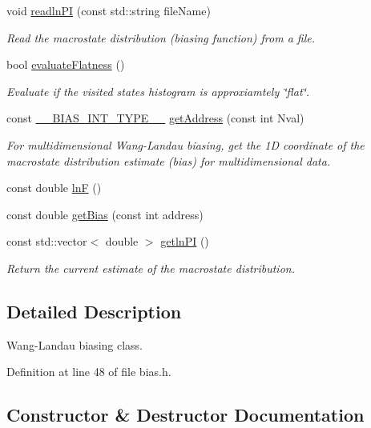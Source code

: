 \begin{DoxyCompactItemize}
void \hyperlink{classwala_ae04916f49c11b0636e813787a3906570}{readln\+P\+I} (const std\+::string file\+Name)
\begin{DoxyCompactList}\small\item\em Read the macrostate distribution (biasing function) from a file. \end{DoxyCompactList}\item 
bool \hyperlink{classwala_add6302db96fcc45811b2944de2936525}{evaluate\+Flatness} ()
\begin{DoxyCompactList}\small\item\em Evaluate if the visited states histogram is approxiamtely \char`\"{}flat\char`\"{}. \end{DoxyCompactList}\item 
const \hyperlink{bias_8h_a1ceb524363fcb94da0c64d297ea27438}{\+\_\+\+\_\+\+B\+I\+A\+S\+\_\+\+I\+N\+T\+\_\+\+T\+Y\+P\+E\+\_\+\+\_\+} \hyperlink{classwala_a01a9bf2af8eaf65c719745ad1b12d238}{get\+Address} (const int Nval)
\begin{DoxyCompactList}\small\item\em For multidimensional Wang-\/\+Landau biasing, get the 1\+D coordinate of the macrostate distribution estimate (bias) for multidimensional data. \end{DoxyCompactList}\item 
const double \hyperlink{classwala_acb8e59580d97bc3c5b9b4ff45eb6bb9a}{ln\+F} ()
\item 
const double \hyperlink{classwala_a03f7b333aa0a280e78060bd9af7ec318}{get\+Bias} (const int address)
\item 
const std\+::vector$<$ double $>$ \hyperlink{classwala_a80b00e34135eb6da4e81cd0935622fc5}{getln\+P\+I} ()
\begin{DoxyCompactList}\small\item\em Return the current estimate of the macrostate distribution. \end{DoxyCompactList}\end{DoxyCompactItemize}


\subsection{Detailed Description}
Wang-\/\+Landau biasing class. 

Definition at line 48 of file bias.\+h.



\subsection{Constructor \& Destructor Documentation}
\hypertarget{classwala_a1a4483327eb3527ecc114c075b0b0598}{}
